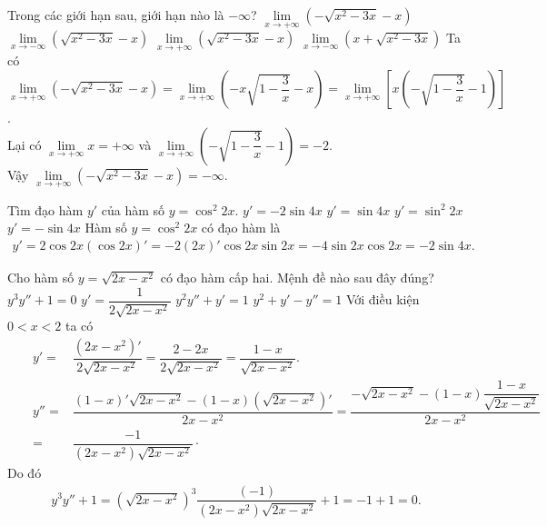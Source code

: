 \begin{ex}%
 Trong các giới hạn sau, giới hạn nào là $-\infty$?
 \choice
  {\True $\lim\limits_{x\to +\infty}\left(-\sqrt{x^2-3x}-x\right)$}
  {$\lim\limits_{x\to -\infty}\left(\sqrt{x^2-3x}-x\right)$}
  {$\lim\limits_{x\to +\infty}\left(\sqrt{x^2-3x}-x\right)$}
  {$\lim\limits_{x\to -\infty}\left(x+\sqrt{x^2-3x}\right)$}
 \loigiai
  {
  Ta có $\lim\limits_{x\to +\infty}\left(-\sqrt{x^2-3x}-x\right) = \lim\limits_{x \to +\infty}\left(-x\sqrt{1 - \dfrac{3}{x}}-x \right) = \lim\limits_{x \to +\infty}\left[x\left(-\sqrt{1 - \dfrac{3}{x}} - 1\right) \right]$.\\
  Lại có $\lim\limits_{x \to +\infty}x = +\infty$ và $\lim\limits_{x \to +\infty}\left(-\sqrt{1 - \dfrac{3}{x}} - 1\right) = -2$.\\
  Vậy $\lim\limits_{x\to +\infty}\left(-\sqrt{x^2-3x}-x\right) = -\infty$.
  }
\end{ex}

\begin{ex}%
 Tìm đạo hàm $y'$ của hàm số $y=\cos^2 2x$.
 \choice
  {\True $y' = -2\sin 4x$}
  {$y' = \sin4x$}
  {$y' = \sin^2 2x$}
  {$y' = -\sin4x$}
 \loigiai
  {
  Hàm số $y = \cos^2 2x$ có đạo hàm là
  \begin{align*}
   y' = 2\cos2x(\cos2x)' = -2(2x)'\cos2x\sin2x = -4\sin2x\cos2x=-2\sin4x.
  \end{align*}
  }
\end{ex}

\begin{ex}%
 Cho hàm số $y = \sqrt{2x - x^2}$ có đạo hàm cấp hai. Mệnh đề nào sau đây đúng?
 \choice
  {\True $y^3y''+1=0$}
  {$y'=\dfrac{1}{2\sqrt{2x-x^2}}$}
  {$y^2y''+y'=1$}
  {$y^2+y'-y''=1$}
 \loigiai
  {
  Với điều kiện $0<x<2$ ta có
  \begin{align*}
   &&y'=& \dfrac{(2x-x^2)'}{2\sqrt{2x-x^2}} = \dfrac{2-2x}{2\sqrt{2x-x^2}} = \dfrac{1-x}{\sqrt{2x-x^2}}.\\
   &&y''=& \dfrac{(1-x)'\sqrt{2x-x^2} - (1-x)\left(\sqrt{2x-x^2}\right)'}{2x-x^2}=\dfrac{-\sqrt{2x-x^2}-(1-x)\dfrac{1-x}{\sqrt{2x-x^2}}}{2x-x^2}\\
   &&=& \dfrac{-1}{(2x-x^2)\sqrt{2x-x^2}}\cdot
  \end{align*}
  Do đó
  \begin{align*}
   y^3y''+1 = \left(\sqrt{2x-x^2}\right)^3\dfrac{(-1)}{(2x-x^2)\sqrt{2x-x^2}}+1 = -1 + 1 = 0.
  \end{align*}
  }
\end{ex}

